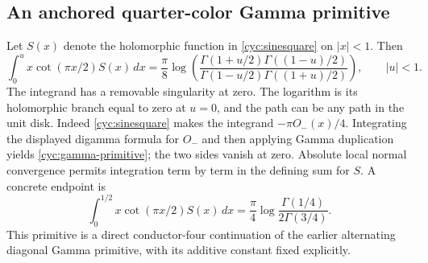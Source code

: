 \subsection{An anchored quarter-color Gamma primitive}

Let $S(x)$ denote the holomorphic function in
\eqref{cyc:sinesquare} on $|x|<1$.  Then
\begin{equation}\label{cyc:gamma-primitive}
 \boxed{\displaystyle
 \int_0^u x\cot(\pi x/2)S(x)\,dx
  =\frac\pi8\log\!\left(
  \frac{\Gamma(1+u/2)\Gamma((1-u)/2)}
       {\Gamma(1-u/2)\Gamma((1+u)/2)}\right),\qquad |u|<1.}
\end{equation}
The integrand has a removable singularity at zero.  The logarithm
is its holomorphic branch equal to zero at $u=0$, and the path can
be any path in the unit disk.  Indeed \eqref{cyc:sinesquare} makes
the integrand $-\pi O_-(x)/4$.  Integrating the displayed digamma
formula for $O_-$ and then applying Gamma duplication yields
\eqref{cyc:gamma-primitive}; the two sides vanish at zero.
Absolute local normal convergence permits integration term by term
in the defining sum for $S$.  A concrete endpoint is
\[
 \int_0^{1/2}x\cot(\pi x/2)S(x)\,dx
       =\frac\pi4\log\frac{\Gamma(1/4)}{2\Gamma(3/4)}.
\]
This primitive is a direct conductor-four continuation of the
earlier alternating diagonal Gamma primitive, with its additive
constant fixed explicitly.
